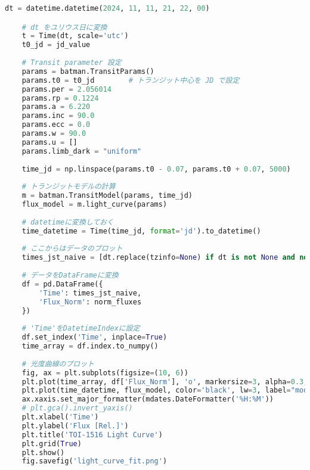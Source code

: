 \begin{lstlisting}[caption=トランジットモデル計算およびプロット用のコード, label=model, language=Python]
    dt = datetime.datetime(2024, 11, 11, 21, 22, 00)

    # dt をユリウス日に変換
    t = Time(dt, scale='utc')
    t0_jd = jd_value
    
    # Transit parameter 設定
    params = batman.TransitParams()
    params.t0 = t0_jd        # トランジット中心を JD で設定
    params.per = 2.056014
    params.rp = 0.1224
    params.a = 6.220
    params.inc = 90.0
    params.ecc = 0.0
    params.w = 90.0
    params.u = []           
    params.limb_dark = "uniform"
    
    time_jd = np.linspace(params.t0 - 0.07, params.t0 + 0.07, 5000)
    
    # トランジットモデルの計算
    m = batman.TransitModel(params, time_jd)
    flux_model = m.light_curve(params)
    
    # datetimeに変換しておく
    time_datetime = Time(time_jd, format='jd').to_datetime()
    
    # ここからはデータのプロット
    times_jst_naive = [dt.replace(tzinfo=None) if dt is not None and not isinstance(dt, float) else dt for dt in times]
    
    # データをDataFrameに変換
    df = pd.DataFrame({
        'Time': times_jst_naive,
        'Flux_Norm': norm_fluxes
    })
    
    # 'Time'をDatetimeIndexに設定
    df.set_index('Time', inplace=True)
    time_array = df.index.to_numpy()
    
    # 光度曲線のプロット
    fig, ax = plt.subplots(figsize=(10, 6))
    plt.plot(time_array, df['Flux_Norm'], 'o', markersize=3, alpha=0.3, color='black', label="data")
    plt.plot(time_datetime, flux_model, color='black', lw=3, label="model")
    ax.xaxis.set_major_formatter(mdates.DateFormatter('%H:%M'))
    # plt.gca().invert_yaxis()
    plt.xlabel('Time')
    plt.ylabel('Flux [Rel.]')
    plt.title('TOI-1516 Light Curve')
    plt.grid(True)
    plt.show()
    fig.savefig('light_curve_fit.png')
\end{lstlisting}